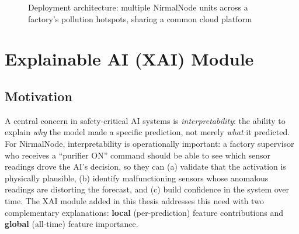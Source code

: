 \begin{figure}[htbp]
\centering
{}
\caption{Deployment architecture: multiple NirmalNode units across a factory's pollution hotspots, sharing a common cloud platform}
\label{fig:deployment-arch}
\end{figure}

\FloatBarrier

\section{Explainable AI (XAI) Module}
\label{sec:meth-xai}

\subsection{Motivation}
\label{sec:meth-xai-motivation}

A central concern in safety-critical AI systems is \emph{interpretability}: the ability to explain \emph{why} the model made a specific prediction, not merely \emph{what} it predicted. For NirmalNode, interpretability is operationally important: a factory supervisor who receives a ``purifier ON'' command should be able to see which sensor readings drove the AI's decision, so they can (a) validate that the activation is physically plausible, (b) identify malfunctioning sensors whose anomalous readings are distorting the forecast, and (c) build confidence in the system over time. The XAI module added in this thesis addresses this need with two complementary explanations: \textbf{local} (per-prediction) feature contributions and \textbf{global} (all-time) feature importance.

